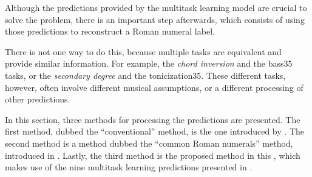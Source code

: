 
Although the predictions provided by the multitask learning
model are crucial to solve the problem, there is an
important step afterwards, which consists of using those
predictions to reconstruct a Roman numeral label.

There is not one way to do this, because multiple tasks are
equivalent and provide similar information. For example, the
\emph{chord inversion} and the \gls{bass35} tasks, or the
\emph{secondary degree} and the \gls{tonicization35}. These
different tasks, however, often involve different musical
assumptions, or a different processing of other predictions.

In this section, three methods for processing the
predictions are presented. The first method, dubbed the
``conventional'' method, is the one introduced by
\textcite{chen2018functional}. The second method is a method
dubbed the ``common Roman numerals'' method, introduced in
\textcite{napoleslopez2021augmentednet}. Lastly, the third
method is the proposed method in this \thesisdiss{}, which
makes use of the nine multitask learning predictions
presented in .
